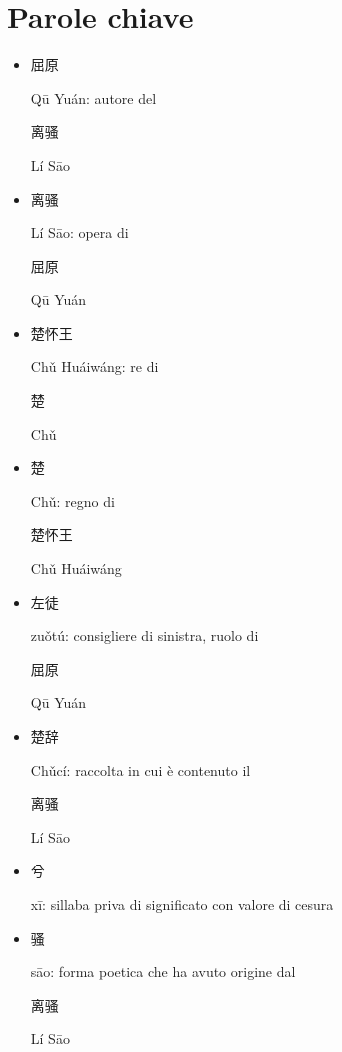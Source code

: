 \documentclass[12pt,titlepage]{article}
\begin{document}
\section{Parole chiave}
\begin{itemize}
\item \begin{CJK*}{UTF8}{gbsn}屈原\end{CJK*} Qū Yuán: autore del \begin{CJK*}{UTF8}{gbsn}离骚\end{CJK*}  Lí Sāo
\item \begin{CJK*}{UTF8}{gbsn}离骚\end{CJK*}  Lí Sāo: opera di\begin{CJK*}{UTF8}{gbsn} 屈原\end{CJK*} Qū Yuán
\item \begin{CJK*}{UTF8}{gbsn}楚怀王\end{CJK*} Chǔ Huáiwáng: re di \begin{CJK*}{UTF8}{gbsn}楚\end{CJK*}  Chǔ
\item \begin{CJK*}{UTF8}{gbsn}楚\end{CJK*}  Chǔ: regno di \begin{CJK*}{UTF8}{gbsn}楚怀王\end{CJK*} Chǔ Huáiwáng
\item \begin{CJK*}{UTF8}{gbsn}左徒 \end{CJK*} zuǒtú:  consigliere di sinistra, ruolo di \begin{CJK*}{UTF8}{gbsn}屈原\end{CJK*} Qū Yuán
\item \begin{CJK*}{UTF8}{gbsn}楚辞 \end{CJK*} Chǔcí: raccolta in cui è contenuto il \begin{CJK*}{UTF8}{gbsn}离骚\end{CJK*} Lí Sāo
\item\begin{CJK*}{UTF8}{gbsn} 兮\end{CJK*}  xī: sillaba priva di significato con valore di cesura
\item\begin{CJK*}{UTF8}{gbsn} 骚 \end{CJK*} sāo: forma poetica che ha avuto origine dal\begin{CJK*}{UTF8}{gbsn} 离骚\end{CJK*}  Lí Sāo

\end{itemize}
\end{document}
